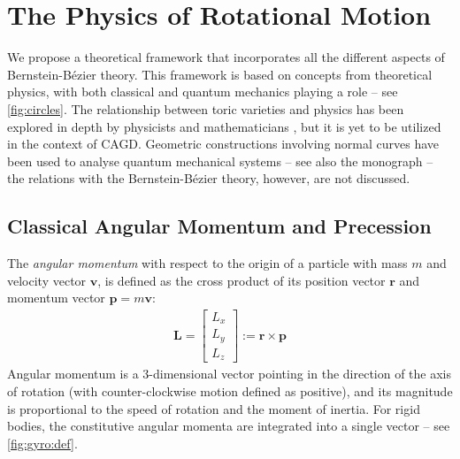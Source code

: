 \documentclass[12pt,final,3p]{elsarticle}
\begin{document}
\section{The Physics of Rotational Motion}\label{sec:rotational}
We propose a theoretical framework that incorporates all the different aspects of Bernstein-B\'{e}zier theory. This framework is based on concepts from theoretical physics, with both classical and quantum mechanics playing a role -- see \autoref{fig:circles}. The relationship between toric varieties and physics has been explored in depth by physicists and mathematicians \cite{atiyah1983angular,guillemin1994moment,da2003symplectic}, but it is yet to be utilized in the context of CAGD. Geometric constructions involving normal curves have been used to analyse quantum mechanical systems \cite{brody2001geometric,brody2012quantum} -- see also the monograph \cite{bengtsson2006geometry} -- the relations with the Bernstein-B\'{e}zier theory, however, are not discussed. 

\subsection{Classical Angular Momentum  and Precession}\label{sec:rotational:classical}
The \emph{angular momentum} with respect to the origin of a particle with mass $m$ and velocity vector $\mathbf{v}$, is defined as the cross product of its position vector $\mathbf{r}$ and momentum vector $\mathbf{p} = m\mathbf{v}$:
\begin{align}
\mathbf{L} = \begin{bmatrix}
L_{x} \\
L_{y} \\
L_{z}
\end{bmatrix} := \mathbf{r} \times \mathbf{p}
\end{align}
Angular momentum is a 3-dimensional vector pointing in the direction of the axis of rotation (with counter-clockwise motion defined as positive), and its magnitude is proportional to the speed of rotation and the moment of inertia. For rigid bodies,  the constitutive angular momenta are integrated into a single vector -- see \autoref{fig:gyro:def}.
\end{document}
